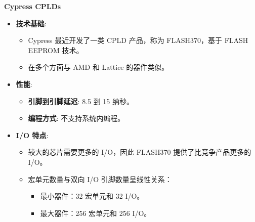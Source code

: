 \documentclass[
  ignorenonframetext,
  chinese,
]{beamer}
\providecommand{\tightlist}{%
  \setlength{\itemsep}{0pt}\setlength{\parskip}{0pt}}
\begin{document}
\begin{frame}
\begin{block}{\textbf{Cypress CPLDs}}
\label{cypress-cplds}
\begin{itemize}
\tightlist
\item
  \textbf{技术基础}:

  \begin{itemize}
  \tightlist
  \item
    Cypress 最近开发了一类 CPLD 产品，称为 FLASH370，基于 FLASH EEPROM
    技术。
  \item
    在多个方面与 AMD 和 Lattice 的器件类似。
  \end{itemize}
\item
  \textbf{性能}:

  \begin{itemize}
  \tightlist
  \item
    \textbf{引脚到引脚延迟}: 8.5 到 15 纳秒。
  \item
    \textbf{编程方式}: 不支持系统内编程。
  \end{itemize}
\item
  \textbf{I/O 特点}:

  \begin{itemize}
  \tightlist
  \item
    较大的芯片需要更多的 I/O，因此 FLASH370 提供了比竞争产品更多的 I/O。
  \item
    宏单元数量与双向 I/O 引脚数量呈线性关系：

    \begin{itemize}
    \tightlist
    \item
      最小器件：32 宏单元和 32 I/O。
    \item
      最大器件：256 宏单元和 256 I/O。
    \end{itemize}
  \end{itemize}
\end{itemize}
\end{block}
\end{frame}
\end{document}

